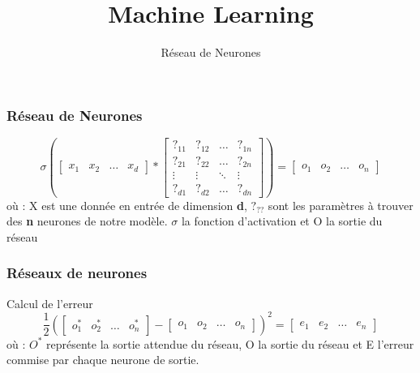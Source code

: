 \documentclass{formation}
\title{Machine Learning}
\subtitle{Réseau de Neurones}
\begin{document}
\maketitle

\begin{frame}
  \frametitle{Réseau de Neurones}
  \[
  \sigma \left(
  \begin{bmatrix}
    x_{1} & x_{2} & \dots & x_{d}
  \end{bmatrix}
  *
  \begin{bmatrix}
    ?_{11} & ?_{12} & \dots  & ?_{1n} \\
    ?_{21} & ?_{22} & \dots  & ?_{2n} \\
    \vdots & \vdots & \ddots & \vdots \\
    ?_{d1} & ?_{d2} & \dots  & ?_{dn}
  \end{bmatrix}
  \right )
  =
  \begin{bmatrix}
    o_{1} & o_{2} & \dots & o_{n}
  \end{bmatrix}
  \]
  \newline
  où :
  \newline
  X est une donnée en entrée de dimension \textbf{d},
  \newline
  $?_{??}$ sont les paramètres à trouver des \textbf{n} neurones de notre modèle.
  \newline
  $\sigma$ la fonction d'activation et
  \newline
  O la sortie du réseau
\end{frame}

\begin{frame}
  \frametitle{Réseaux de neurones}
  Calcul de l'erreur
  \[
  \frac{1}{2}\left (
  \begin{bmatrix}
    o_{1}^* & o_{2}^* & \dots & o_{n}^*
  \end{bmatrix}
  -
  \begin{bmatrix}
    o_{1} & o_{2} & \dots & o_{n}
  \end{bmatrix}
  \right )^2
  =
  \begin{bmatrix}
    e_{1} & e_{2} & \dots & e_{n}
  \end{bmatrix}
  \]
  \newline
  où :
  \newline
  $O^*$ représente la sortie attendue du réseau,
  \newline
  O la sortie du réseau et
  \newline
  E l'erreur commise par chaque neurone de sortie.
  \newline
\end{frame}
\end{document}
